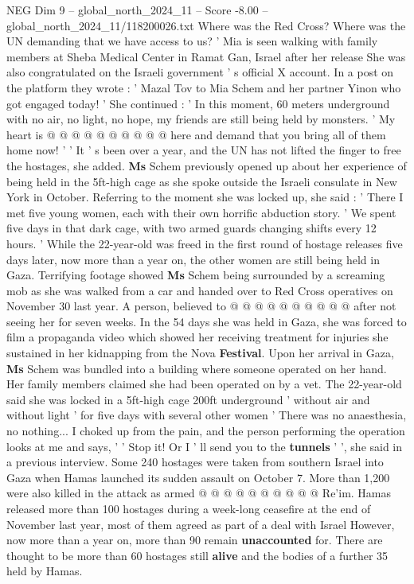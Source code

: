 \begin{textsample}{NEG Dim 9 – global\_north\_2024\_11 – Score -8.00 – global\_north\_2024\_11/118200026.txt}
Where was the Red Cross?
Where was the UN demanding that we have access to us? ' Mia is seen walking with family members at Sheba Medical Center in Ramat Gan, Israel after her release She was also congratulated on the Israeli government ' s official X account.
In a post on the platform they wrote : ' Mazal Tov to Mia Schem and her partner Yinon who got engaged today! ' She continued : ' In this moment, 60 meters underground with no air, no light, no hope, my friends are still being held by monsters. ' My heart is @ @ @ @ @ @ @ @ @ @ here and demand that you bring all of them home now! ' ' It ' s been over a year, and the UN has not lifted the finger to free the hostages, she added. \textbf{Ms} Schem previously opened up about her experience of being held in the 5ft-high cage as she spoke outside the Israeli consulate in New York in October.
Referring to the moment she was locked up, she said : ' There I met five young women, each with their own horrific abduction story. ' We spent five days in that dark cage, with two armed guards changing shifts every 12 hours. ' While the 22-year-old was freed in the first round of hostage releases five days later, now more than a year on, the other women are still being held in Gaza.
Terrifying footage showed \textbf{Ms} Schem being surrounded by a screaming mob as she was walked from a car and handed over to Red Cross operatives on November 30 last year.
A person, believed to @ @ @ @ @ @ @ @ @ @ after not seeing her for seven weeks.
In the 54 days she was held in Gaza, she was forced to film a propaganda video which showed her receiving treatment for injuries she sustained in her kidnapping from the Nova \textbf{Festival}.
Upon her arrival in Gaza, \textbf{Ms} Schem was bundled into a building where someone operated on her hand.
Her family members claimed she had been operated on by a vet.
The 22-year-old said she was locked in a 5ft-high cage 200ft underground ' without air and without light ' for five days with several other women ' There was no anaesthesia, no nothing...
I choked up from the pain, and the person performing the operation looks at me and says, ' ' Stop it!
Or I ' ll send you to the \textbf{tunnels} ' ', she said in a previous interview.
Some 240 hostages were taken from southern Israel into Gaza when Hamas launched its sudden assault on October 7.
More than 1,200 were also killed in the attack as armed @ @ @ @ @ @ @ @ @ @ Re'im.
Hamas released more than 100 hostages during a week-long ceasefire at the end of November last year, most of them agreed as part of a deal with Israel However, now more than a year on, more than 90 remain \textbf{unaccounted} for.
There are thought to be more than 60 hostages still \textbf{alive} and the bodies of a further 35 held by Hamas.

\end{textsample}
